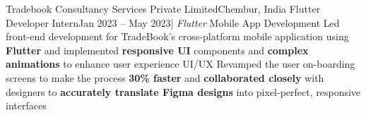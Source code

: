     \resumeSubheading
    {Tradebook Consultancy Services Private Limited}{Chembur, India}
    {Flutter Developer Intern}{Jan 2023 -- May 2023}{| \textit{Flutter}}
    \resumeItemListStart
    \resumeItem
      {Mobile App Development}
      {Led front-end development for TradeBook's cross-platform mobile application using \textbf{Flutter} and implemented \textbf{responsive UI} components and \textbf{complex animations} to enhance user experience}
    \resumeItem
      {UI/UX}
      {Revamped the user on-boarding screens to make the process \textbf{30\% faster} and \textbf{collaborated closely} with designers to \textbf{accurately translate Figma designs} into pixel-perfect, responsive interfaces}
    \resumeItemListEnd